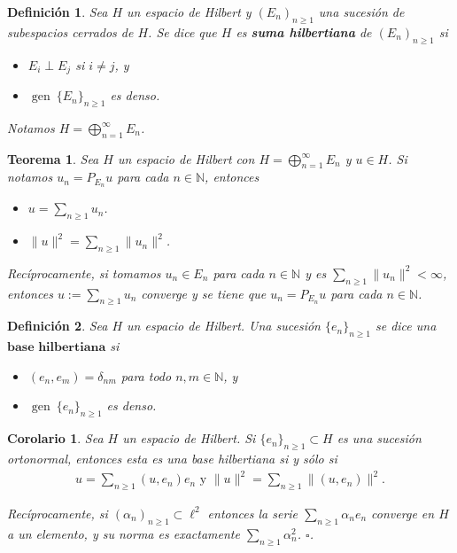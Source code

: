 \documentclass[11pt]{report}
\theoremstyle{colored}
\newtheorem{definition}{Definición}[section]
\newtheorem{theorem}{Teorema}[section]
\newtheorem{corollary}{Corolario}[section]
\newcommand{\N}{\mathbb{N}}
\newcommand{\ip}[1]{( #1 )}
\newcommand{\paint}[1]{\color{color}{#1}}
\begin{document}
\begin{definition} Sea $H$ un espacio de Hilbert y $(E_n)_{n \geq 1}$ una sucesión de subespacios cerrados de $H$. Se dice que $H$ es \textbf{suma hilbertiana} de $(E_n)_{n \geq 1}$ si 
\begin{itemize}
\item[$\paint{\bullet}$] $E_i \perp E_j$ si $i \neq j$, y
\item[$\paint{\bullet}$] $\operatorname{gen} \ \{E_n\}_{n \geq 1}$ es denso.
\end{itemize}
Notamos $H = \bigoplus_{n = 1}^\infty E_n$.
\end{definition}

\begin{theorem} Sea $H$ un espacio de Hilbert con $H = \bigoplus_{n = 1}^\infty E_n$ y $u \in H$. Si notamos $u_n = P_{E_n}u$ para cada $n \in \N$, entonces
\begin{itemize}
\item[(i)] $u = \sum_{n \geq 1}u_n$.
\item[(ii)] $\|u\|^2 = \sum_{n \geq 1}\|u_n\|^2$.
\end{itemize}

Recíprocamente, si tomamos $u_n \in E_n$ para cada $n \in \N$ y es $\sum_{n \geq 1}\|u_n\|^2 < \infty$, entonces $u := \sum_{n \geq 1}u_n$ converge y se tiene que $u_n = P_{E_n}u$ para cada $n \in \N$.
\end{theorem}

\begin{definition} Sea $H$ un espacio de Hilbert. Una sucesión $\{e_n\}_{n \geq 1}$ se dice una $\textbf{base hilbertiana}$ si
\begin{itemize}
\item[$\paint{\bullet}$] $\ip{e_n,e_m} = \delta_{nm}$ para todo $n,m \in \N$, y
\item[$\paint{\bullet}$] $\operatorname{gen} \ \{e_n\}_{n \geq 1}$ es denso.
\end{itemize}
\end{definition}

\begin{corollary} Sea $H$ un espacio de Hilbert. Si $\{e_n\}_{n \geq 1} \subset H$ es una sucesión ortonormal, entonces esta es una base hilbertiana si y sólo si 
\begin{align*}
u = \sum_{n \geq 1}(u,e_n)e_n \text{ y } \|u\|^2 = \sum_{n \geq 1}\|(u,e_n)\|^2.
\end{align*}

Recíprocamente, si $(\alpha_n)_{n \geq 1} \subset \ell^2$ entonces la serie $\sum_{n \geq 1}\alpha_n e_n$ converge en $H$ a un elemento, y su norma es exactamente $\sum_{n \geq 1}\alpha_n^2$. $\square$.
\end{corollary}
\end{document}
